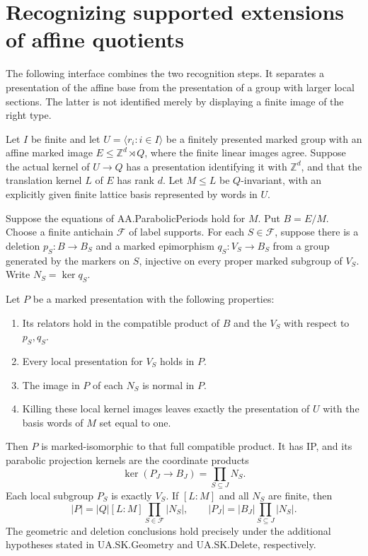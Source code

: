 \section{Recognizing supported extensions of affine quotients}
\label{sec:period-extensions}

The following interface combines the two recognition steps. It separates a
presentation of the affine base from the presentation of a group with larger
local sections. The latter is not identified merely by displaying a finite
image of the right type.

\begin{theorem}[AA.PeriodExtension]\label{thm:period-extension}
Let $I$ be finite and let $U=\langle r_i:i\in I\rangle$ be a finitely
presented marked group with an affine marked image
$E\leq\mathbb Z^d\rtimes Q$, where the finite linear images agree. Suppose
the actual kernel of $U\to Q$ has a presentation identifying it with
$\mathbb Z^d$, and that the translation kernel $L$ of $E$ has rank $d$.
Let $M\leq L$ be $Q$-invariant, with an explicitly given finite lattice
basis represented by words in $U$.

Suppose the equations of AA.ParabolicPeriods hold for $M$. Put $B=E/M$.
Choose a finite antichain $\mathcal F$ of label supports. For each
$S\in\mathcal F$, suppose there is a deletion $p_S:B\to B_S$ and a
marked epimorphism $q_S:V_S\to B_S$ from a group generated by the
markers on $S$, injective on every proper marked
subgroup of $V_S$. Write $N_S=\ker q_S$.

Let $P$ be a marked presentation with the following properties:
\begin{enumerate}
\item Its relators hold in the compatible product of $B$ and the $V_S$
with respect to $p_S,q_S$.
\item Every local presentation for $V_S$ holds in $P$.
\item The image in $P$ of each $N_S$ is normal in $P$.
\item Killing these local kernel images leaves exactly the presentation
of $U$ with the basis words of $M$ set equal to one.
\end{enumerate}
Then $P$ is marked-isomorphic to that full compatible product. It has IP,
and its parabolic projection kernels are the coordinate products
\[
 \ker(P_J\to B_J)=\prod_{S\subseteq J}N_S.
\]
Each local subgroup $P_S$ is exactly $V_S$. If $[L:M]$ and all $N_S$ are
finite, then
\[
 |P|=|Q|[L:M]\prod_{S\in\mathcal F}|N_S|,
 \qquad |P_J|=|B_J|\prod_{S\subseteq J}|N_S|.
\]
The geometric and deletion conclusions hold precisely under the additional
hypotheses stated in UA.SK.Geometry and UA.SK.Delete, respectively.
\end{theorem}
